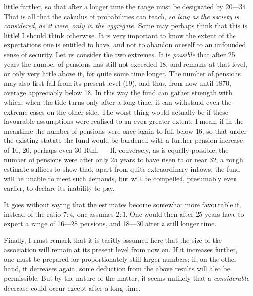 little further, so that after a longer time the range must be designated by 20—34. That is all that the calculus of probabilities can teach, \textit{so long as the society is considered, as it were, only in the aggregate.} Some may perhaps think that this is little! I should think otherwise. It is very important to know the extent of the expectations one is entitled to have, and not to abandon oneself to an unfounded sense of security. Let us consider the two extremes. It is \textit{possible} that after 25 years the number of pensions has still not exceeded 18, and remains at that level, or only very little above it, for quite some time longer. The number of pensions may also first fall from its present level (19), and thus, from now until 1870, average appreciably below 18. In this way the fund can gather strength with which, when the tide turns only after a long time, it can withstand even the extreme cases on the other side. The worst thing would actually be if these favourable assumptions were realised to an even greater extent; I mean, if in the meantime the number of pensions were once again to fall below 16, so that under the existing statute the fund would be burdened with a further pension increase of 10, 20, perhaps even 30 Rthl. — If, conversely, as is equally possible, the number of pensions were after only 25 years to have risen to or near 32, a rough estimate suffices to show that, apart from quite extraordinary inflows, the fund will be unable to meet such demands, but will be compelled, presumably even earlier, to declare its inability to pay.

It goes without saying that the estimates become somewhat more favourable if, instead of the ratio \(7:4\), one assumes \(2:1\). One would then after 25 years have to expect a range of 16—28 pensions, and 18—30 after a still longer time.

Finally, I must remark that it is tacitly assumed here that the size of the association will remain at its present level from now on. If it increases further, one must be prepared for proportionately still larger numbers; if, on the other hand, it decreases again, some deduction from the above results will also be permissible. But by the nature of the matter, it seems unlikely that a \textit{considerable} decrease could occur except after a long time.

